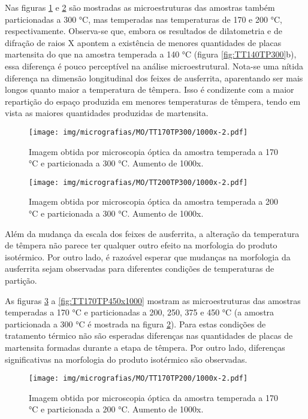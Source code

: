 Nas figuras \ref{fig:TT170TP300x1000} e \ref{fig:TT200TP300x1000} são mostradas as microestruturas das amostras também particionadas a 300 °C, mas temperadas nas temperaturas de 170 e 200 °C, respectivamente. Observa-se que, embora os resultados de dilatometria e de difração de raios X apontem a existência de menores quantidades de placas martensita do que na amostra temperada a 140 °C (figura \ref{fig:TT140TP300}b), essa diferença é pouco perceptível na análise microestrutural. Nota-se uma nítida diferença na dimensão longitudinal dos feixes de ausferrita, aparentando ser mais longos quanto maior a temperatura de têmpera. Isso é condizente com a maior repartição do espaço produzida em menores temperaturas de têmpera, tendo em vista as maiores quantidades produzidas de martensita.

\begin{figure}
	\texttt{[image: img/micrografias/MO/TT170TP300/1000x-2.pdf]}
	\caption{Imagem obtida por microscopia óptica da amostra temperada a 170 °C e particionada a 300 °C. Aumento de 1000x.}
	\label{fig:TT170TP300x1000}
\end{figure}

\begin{figure}
	\texttt{[image: img/micrografias/MO/TT200TP300/1000x-2.pdf]}
	\caption{Imagem obtida por microscopia óptica da amostra temperada a 200 °C e particionada a 300 °C. Aumento de 1000x.}
	\label{fig:TT200TP300x1000}
\end{figure}

Além da mudança da escala dos feixes de ausferrita, a alteração da temperatura de têmpera não parece ter qualquer outro efeito na morfologia do produto isotérmico. Por outro lado, é razoável esperar que mudanças na morfologia da ausferrita sejam observadas para diferentes condições de temperaturas de partição.

As figuras \ref{fig:TT170TP200x1000} a \ref{fig:TT170TP450x1000} mostram as microestruturas das amostras temperadas a 170 °C e particionadas a 200, 250, 375 e 450 °C (a amostra particionada a 300 °C é mostrada na figura \ref{fig:TT200TP300x1000}). Para estas condições de tratamento térmico não são esperadas diferenças nas quantidades de placas de martensita formadas durante a etapa de têmpera. Por outro lado, diferenças significativas na morfologia do produto isotérmico são observadas.

\begin{figure}
	\texttt{[image: img/micrografias/MO/TT170TP200/1000x-2.pdf]}
	\caption{Imagem obtida por microscopia óptica da amostra temperada a 170 °C e particionada a 200 °C. Aumento de 1000x.}
	\label{fig:TT170TP200x1000}
\end{figure}

